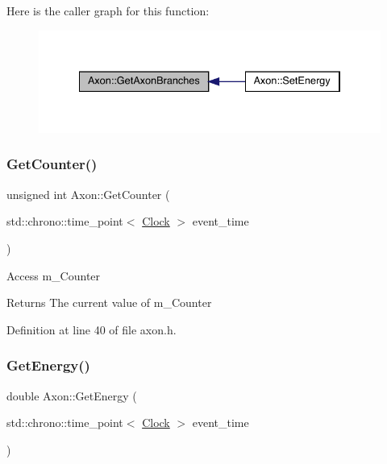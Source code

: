 Here is the caller graph for this function\+:
\nopagebreak
\begin{figure}[H]
\begin{center}
\leavevmode
\includegraphics[width=334pt]{class_axon_adf5796ef2f72ce56516b37e7e09e9d6c_icgraph}
\end{center}
\end{figure}
\mbox{\label{class_axon_a390ff1f3d85034fc85bcafc7374da9c7}} 
\subsubsection{\texorpdfstring{Get\+Counter()}{GetCounter()}}
{\footnotesize\ttfamily unsigned int Axon\+::\+Get\+Counter (\begin{DoxyParamCaption}\item[{std\+::chrono\+::time\+\_\+point$<$ \hyperlink{universe_8h_a0ef8d951d1ca5ab3cfaf7ab4c7a6fd80}{Clock} $>$}]{event\+\_\+time }\end{DoxyParamCaption})\hspace{0.3cm}{\ttfamily [inline]}}

Access m\+\_\+\+Counter \begin{DoxyReturn}{Returns}
The current value of m\+\_\+\+Counter 
\end{DoxyReturn}


Definition at line 40 of file axon.\+h.

\mbox{\label{class_axon_a37a1ca2b0454d77dc0bc93e493feb0ce}} 
\subsubsection{\texorpdfstring{Get\+Energy()}{GetEnergy()}}
{\footnotesize\ttfamily double Axon\+::\+Get\+Energy (\begin{DoxyParamCaption}\item[{std\+::chrono\+::time\+\_\+point$<$ \hyperlink{universe_8h_a0ef8d951d1ca5ab3cfaf7ab4c7a6fd80}{Clock} $>$}]{event\+\_\+time }\end{DoxyParamCaption})\hspace{0.3cm}{\ttfamily [inline]}}



